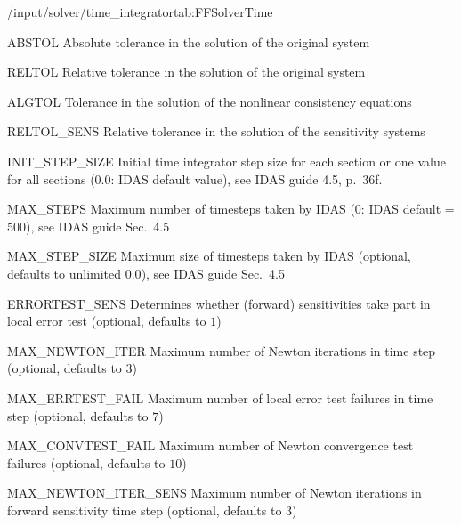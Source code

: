 \begin{groupscope}{/input/solver/time\_integrator}{tab:FFSolverTime}
  \begin{dataset}[type=double,range={$> 0$},length=1]{ABSTOL}
    Absolute tolerance in the solution of the original system
  \end{dataset}
  \begin{dataset}[type=double,range={$\geq 0$},length=1]{RELTOL}
    Relative tolerance in the solution of the original system
  \end{dataset}
  \begin{dataset}[type=double,range={$> 0$},length=1]{ALGTOL}
    Tolerance in the solution of the nonlinear consistency equations
  \end{dataset}
  \begin{dataset}[type=double,range={$\geq 0$},length=1]{RELTOL\_SENS}
    Relative tolerance in the solution of the sensitivity systems
  \end{dataset}
  \begin{dataset}[type=double,unit={\si{\second}},range={$\geq 0$},length={$1$ / \texttt{NSEC}}]{INIT\_STEP\_SIZE}
    Initial time integrator step size for each section or one value for all sections ($0.0$: IDAS default value), see IDAS guide 4.5, p.\ 36f.
  \end{dataset}
  \begin{dataset}[type=int,range={$\geq 0$},length=1]{MAX\_STEPS}
    Maximum number of timesteps taken by IDAS (0: IDAS default = 500), see IDAS guide Sec.~4.5
  \end{dataset}
  \begin{dataset}[type=double,unit={\si{\second}},range={$\geq 0$},length=1]{MAX\_STEP\_SIZE}
    Maximum size of timesteps taken by IDAS (optional, defaults to unlimited $0.0$), see IDAS guide Sec.~4.5
  \end{dataset}
  \begin{dataset}[type=int,range={$\{0,1\}$},length=1]{ERRORTEST\_SENS}
    Determines whether (forward) sensitivities take part in local error test (optional, defaults to $1$)
  \end{dataset}
  \begin{dataset}[type=int,range={$\geq 0$},length=1]{MAX\_NEWTON\_ITER}
    Maximum number of Newton iterations in time step (optional, defaults to $3$)
  \end{dataset}
  \begin{dataset}[type=int,range={$\geq 0$},length=1]{MAX\_ERRTEST\_FAIL}
    Maximum number of local error test failures in time step (optional, defaults to $7$)
  \end{dataset}
  \begin{dataset}[type=int,range={$\geq 0$},length=1]{MAX\_CONVTEST\_FAIL}
    Maximum number of Newton convergence test failures (optional, defaults to $10$)
  \end{dataset}
  \begin{dataset}[type=int,range={$\geq 0$},length=1]{MAX\_NEWTON\_ITER\_SENS}
    Maximum number of Newton iterations in forward sensitivity time step (optional, defaults to $3$)
  \end{dataset}
\end{groupscope}

